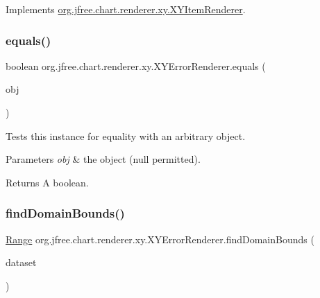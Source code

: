 Implements \mbox{\hyperlink{interfaceorg_1_1jfree_1_1chart_1_1renderer_1_1xy_1_1_x_y_item_renderer_ad867040a3ea09f5127596aacdd94586a}{org.\+jfree.\+chart.\+renderer.\+xy.\+X\+Y\+Item\+Renderer}}.

\mbox{\label{classorg_1_1jfree_1_1chart_1_1renderer_1_1xy_1_1_x_y_error_renderer_a91d247b738957faa9acd6b3b8e90a75e}} 
\subsubsection{\texorpdfstring{equals()}{equals()}}
{\footnotesize\ttfamily boolean org.\+jfree.\+chart.\+renderer.\+xy.\+X\+Y\+Error\+Renderer.\+equals (\begin{DoxyParamCaption}\item[{Object}]{obj }\end{DoxyParamCaption})}

Tests this instance for equality with an arbitrary object.


\begin{DoxyParams}{Parameters}
{\em obj} & the object ({\ttfamily null} permitted).\\
\hline
\end{DoxyParams}
\begin{DoxyReturn}{Returns}
A boolean. 
\end{DoxyReturn}
\mbox{\label{classorg_1_1jfree_1_1chart_1_1renderer_1_1xy_1_1_x_y_error_renderer_a9776b39a3a9dc9ede952ec6044e7975f}} 
\subsubsection{\texorpdfstring{find\+Domain\+Bounds()}{findDomainBounds()}}
{\footnotesize\ttfamily \mbox{\hyperlink{classorg_1_1jfree_1_1data_1_1_range}{Range}} org.\+jfree.\+chart.\+renderer.\+xy.\+X\+Y\+Error\+Renderer.\+find\+Domain\+Bounds (\begin{DoxyParamCaption}\item[{\mbox{\hyperlink{interfaceorg_1_1jfree_1_1data_1_1xy_1_1_x_y_dataset}{X\+Y\+Dataset}}}]{dataset }\end{DoxyParamCaption})}

